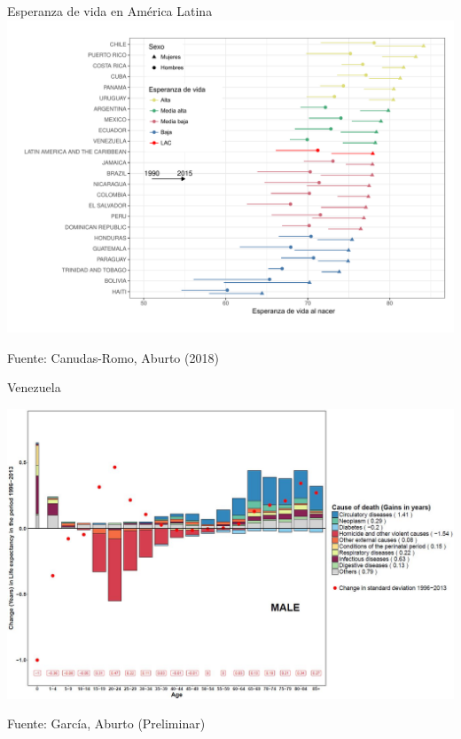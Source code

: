 \documentclass[xcolor={dvipsnames}]{beamer}
\begin{document}
\begin{frame}
\Large{
				\begin{center}
				Esperanza de vida en Am\'erica Latina
\includegraphics[scale=.4]{Figures/Fig1_V4}
				\end{center}				
}
\vspace{-2em}\tiny{Fuente: Canudas-Romo, Aburto (2018)}		
\end{frame}


\begin{frame}
Venezuela
\Large{
				\begin{center}
\includegraphics[scale=.37]{Figures/Venezuela}
				\end{center}				
}
\vspace{-1em}\tiny{Fuente: Garc\'ia, Aburto (Preliminar)}		
\end{frame}
\end{document}

